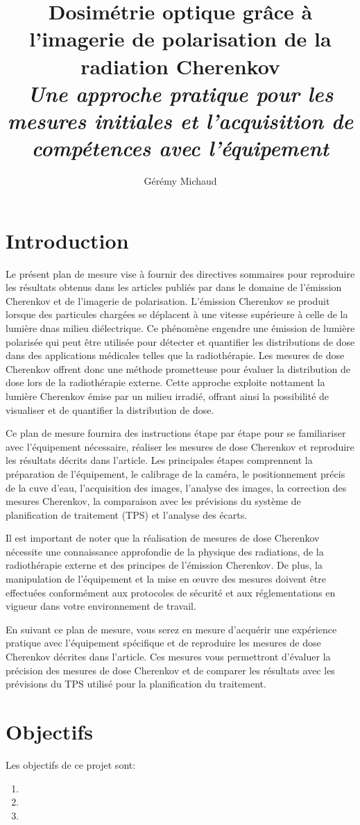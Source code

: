 \documentclass{Thesis}
\title{Dosimétrie optique grâce à l'imagerie de polarisation de la radiation Cherenkov
\\\Large{\textit{Une approche pratique pour les mesures initiales et l'acquisition de compétences avec l'équipement}}}
\author{Gérémy Michaud}{G. Michaud}
\begin{document}
\section*{Introduction}
Le présent plan de mesure vise à fournir des directives sommaires pour reproduire les
résultats obtenus dans les articles publiés par \citeauthor{cloutier_accurate_2022} \cite{cloutier_accurate_2022,cloutier_direct_2022}
dans le domaine de l'émission Cherenkov et de l'imagerie de polarisation.
L'émission Cherenkov se produit lorsque des particules chargées se déplacent à une vitesse supérieure à celle de la lumière
dnas milieu diélectrique. Ce phénomène engendre une émission de lumière polarisée qui peut
être utilisée pour détecter et quantifier les distributions de dose dans des applications
médicales telles que la radiothérapie. Les mesures de dose Cherenkov offrent donc une
méthode prometteuse pour évaluer la distribution de dose lors de la radiothérapie externe.
Cette approche exploite nottament la lumière Cherenkov émise par un milieu irradié,
offrant ainsi la possibilité de visualiser et de quantifier la distribution de dose.

Ce plan de mesure fournira des instructions étape par étape pour se familiariser avec l'équipement nécessaire, réaliser les mesures de dose Cherenkov et reproduire les résultats décrits dans l'article. Les principales étapes comprennent la préparation de l'équipement, le calibrage de la caméra, le positionnement précis de la cuve d'eau, l'acquisition des images, l'analyse des images, la correction des mesures Cherenkov, la comparaison avec les prévisions du système de planification de traitement (TPS) et l'analyse des écarts.

Il est important de noter que la réalisation de mesures de dose Cherenkov nécessite une connaissance approfondie de la physique des radiations, de la radiothérapie externe et des principes de l'émission Cherenkov. De plus, la manipulation de l'équipement et la mise en œuvre des mesures doivent être effectuées conformément aux protocoles de sécurité et aux réglementations en vigueur dans votre environnement de travail.

En suivant ce plan de mesure, vous serez en mesure d'acquérir une expérience pratique avec l'équipement spécifique et de reproduire les mesures de dose Cherenkov décrites dans l'article. Ces mesures vous permettront d'évaluer la précision des mesures de dose Cherenkov et de comparer les résultats avec les prévisions du TPS utilisé pour la planification du traitement.
\section*{Objectifs}
Les objectifs de ce projet sont:
\begin{enumerate}
    \setlength\itemsep{1mm}
    \item 
    \item 
    \item 
\end{enumerate}
\end{document}
